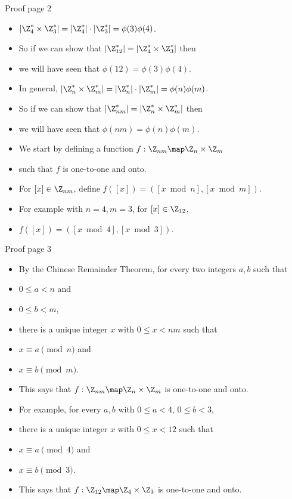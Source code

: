 \documentclass{beamer}
\begin{document}
\begin{frame}{Proof page 2}

\begin{itemize}
  \item $|\Z_4^* \times \Z_3^*| = |\Z_4^*| \cdot |\Z_3^*| = \phi(3) \phi(4)$.
  \item So if we can show that $|\Z^*_{12}| =  |\Z_4^* \times \Z_3^*|$ then
  \item we will have seen that $\phi(12) = \phi(3)\phi(4)$.
  \item In general,  $|\Z_n^* \times \Z_m^*| = |\Z_n^*| \cdot |\Z_m^*| = \phi(n) \phi(m)$.
  \item So if we can show that $|\Z_{nm}^*| = |\Z_n^* \times \Z_m^*|$ then
  \item we will have seen that $\phi(nm) = \phi(n)\phi(m)$.
  \item We start by defining a function $f:\Z_{nm}\map \Z_n \times \Z_m$
  \item such that $f$ is one-to-one and onto.
  \item For $[x]\in\Z_{nm}$, define $f([x]) = \left([x \bmod n], [x \bmod m] \right)$.
  \item For example with $n=4, m=3$, for $[x]\in\Z_{12}$,
  \item $f([x]) = \left([x \bmod 4], [x \bmod 3] \right)$.
\end{itemize}

\end{frame}

\begin{frame}{Proof page 3}

\begin{itemize}
  \item By the Chinese Remainder Theorem, for every two integers $a,b$ such that
  \item $0\leq a < n$ and
  \item $0\leq b <m$,
  \item there is a unique integer $x$ with $0\leq x < nm$ such that
  \item $x \equiv a \pmod n$ and
  \item $x\equiv b \pmod m$.
  \item This says that $f:\Z_{nm}\map \Z_n \times \Z_m$ is one-to-one and onto.
  \item For example, for every $a,b$ with $0\leq a < 4$, $0\leq b < 3$,
  \item there is a unique integer $x$ with $0\leq x < 12$ such that
  \item $x \equiv a \pmod 4$ and
  \item $x\equiv b \pmod 3$.
  \item This says that $f:\Z_{12}\map \Z_4 \times \Z_3$ is one-to-one and onto.
\end{itemize}

\end{frame}
\end{document}
